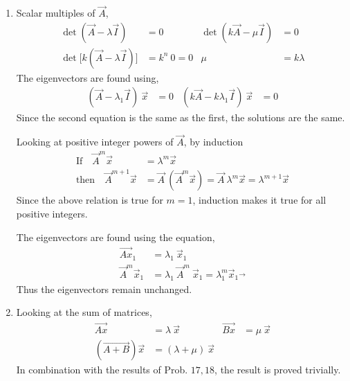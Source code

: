 \begin{enumerate}
    \item Scalar multiples of $ \vec{A} $,
          \begin{align}
              \det(\vec{A} - \lambda\vec{I})            & = 0          &
              \det(k\vec{A} - \mu \vec{I})              & = 0            \\
              \det\Big[k(\vec{A} - \lambda\vec{I})\Big] & = k^n\ 0 = 0 &
              \mu                                       & = k\lambda
          \end{align}
          The eigenvectors are found using,
          \begin{align}
              (\vec{A} - \lambda_1 \vec{I})\ \vec{x}   & = 0 &
              (k\vec{A} - k\lambda_1 \vec{I})\ \vec{x} & = 0
          \end{align}
          Since the second equation is the same as the first, the solutions are the same.
          \par Looking at positive integer powers of $ \vec{A} $, by induction
          \begin{align}
              \text{If} \quad \vec{A}^m \vec{x}       & = \lambda^m \vec{x}           \\
              \text{then} \quad \vec{A}^{m+1} \vec{x} & = \vec{A}\ (\vec{A}^m\vec{x})
              = \vec{A}\ \lambda^m \vec{x}
              = \lambda^{m+1}\vec{x}
          \end{align}
          Since the above relation is true for $ m = 1 $, induction makes it true for
          all positive integers.
          \par The eigenvectors are found using the equation,
          \begin{align}
              \vec{Ax}_1          & = \lambda_1\ \vec{x}_1            \\
              \vec{A}^m \vec{x}_1 & = \lambda_1\ \vec{A}^m\ \vec{x}_1
              = \lambda_1^m \vec{x}_1
              \vec{}
          \end{align}
          Thus the eigenvectors remain unchanged.

    \item Looking at the sum of matrices,
          \begin{align}
              \vec{Ax}             & = \lambda\ \vec{x}         &
              \vec{Bx}             & = \mu\ \vec{x}               \\
              (\vec{A + B})\vec{x} & = (\lambda + \mu)\ \vec{x}
          \end{align}
          In combination with the results of Prob. $ 17, 18 $, the result is proved
          trivially.


\end{enumerate}
